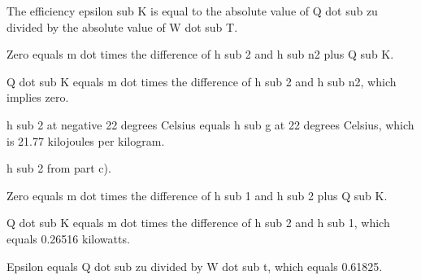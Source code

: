The efficiency epsilon sub K is equal to the absolute value of Q dot sub zu divided by the absolute value of W dot sub T.

Zero equals m dot times the difference of h sub 2 and h sub n2 plus Q sub K.

Q dot sub K equals m dot times the difference of h sub 2 and h sub n2, which implies zero.

h sub 2 at negative 22 degrees Celsius equals h sub g at 22 degrees Celsius, which is 21.77 kilojoules per kilogram.

h sub 2 from part c).

Zero equals m dot times the difference of h sub 1 and h sub 2 plus Q sub K.

Q dot sub K equals m dot times the difference of h sub 2 and h sub 1, which equals 0.26516 kilowatts.

Epsilon equals Q dot sub zu divided by W dot sub t, which equals 0.61825.